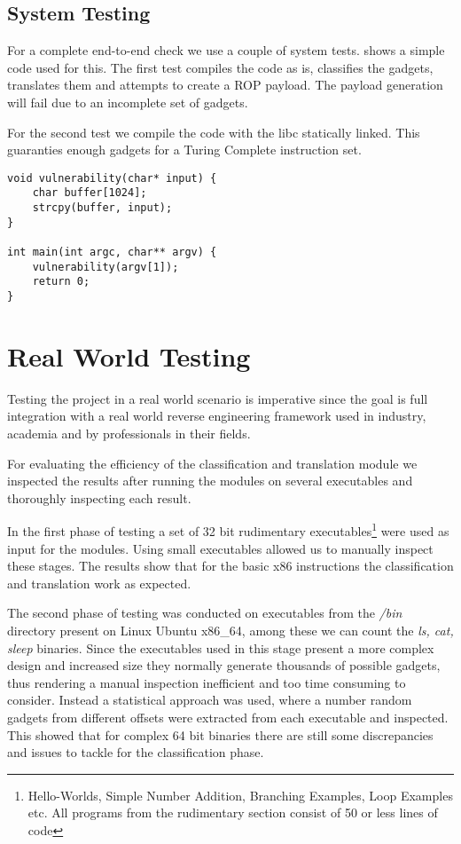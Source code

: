 \subsection{System Testing}

For a complete end-to-end check we use a couple of system tests.  shows a simple code used for this. The first test compiles the code as is, classifies the gadgets, translates them and attempts to create a ROP payload. The payload generation will fail due to an incomplete set of gadgets.

For the second test we compile the code with the libc statically linked. This guaranties enough gadgets for a Turing Complete instruction set.

\begin{lstlisting}[frame=single]
void vulnerability(char* input) {
	char buffer[1024];
	strcpy(buffer, input);
}

int main(int argc, char** argv) {
	vulnerability(argv[1]);
	return 0;
}
\end{lstlisting}

\section{Real World Testing}

Testing the project in a real world scenario is imperative since the goal is full integration with a real world reverse engineering framework used in industry, academia and by professionals in their fields.

For evaluating the efficiency of the classification and translation module we inspected the results after running the modules on several executables and thoroughly inspecting each result.

In the first phase of testing a set of 32 bit rudimentary executables\footnote{Hello-Worlds, Simple Number Addition, Branching Examples, Loop Examples etc. All programs from the rudimentary section consist of 50 or less lines of code} were used as input for the modules. Using small executables allowed us to manually inspect these stages. The results show that for the basic x86 instructions the classification and translation work as expected.

The second phase of testing was conducted on executables from the \textit{/bin} directory present on Linux Ubuntu x86_64, among these we can count the \textit{ls, cat, sleep} binaries. Since the executables used in this stage present a more complex design and increased size they normally generate thousands of possible gadgets, thus rendering a manual inspection inefficient and too time consuming to consider. Instead a statistical approach was used, where a number random gadgets from different offsets were extracted from each executable and inspected. This showed that for complex 64 bit binaries there are still some discrepancies and issues to tackle for the classification phase.

